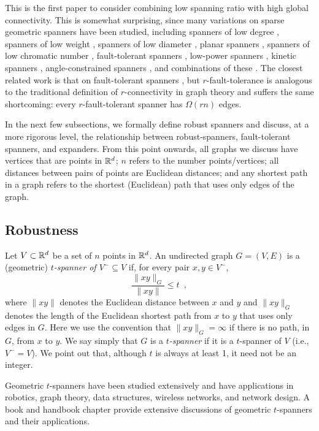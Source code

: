 \documentclass[final]{siamltex}
\begin{document}
This is the first paper to consider combining low spanning ratio
with high global connectivity.  This is somewhat surprising, since
many variations on sparse geometric spanners have been studied,
including spanners of low degree \cite{abcghsv08,cc10,s06}, spanners
of low weight \cite{bcfms10,dn97,gln02}, spanners of low diameter
\cite{ams94,ams99}, planar spanners \cite{accdsz96,c89,dj89,kg89},
spanners of low chromatic number \cite{bccmsz09}, fault-tolerant
spanners \cite{abfg09,cz04,lns02,l99}, low-power spanners
\cite{aack11,ss10,wl06}, kinetic spanners \cite{ab11,abg10},
angle-constrained spanners \cite{cs10}, and combinations of these
\cite{admss95,as97,bfrv12,bgs05,bsx09,cc10b}.  The closest related
work is that on fault-tolerant spanners \cite{abfg09,cz04,lns02,l99},
but $r$-fault-tolerance is analogous to the traditional definition
of $r$-connectivity in graph theory and suffers the same shortcoming:
every $r$-fault-tolerant spanner has $\Omega(rn)$ edges.

In the next few subsections, we formally define robust spanners
and discuss, at a more rigorous level, the relationship between
robust-spanners, fault-tolerant spanners, and expanders.  From this point
onwards, all graphs we discuss have vertices that are points in $\mathbb{R}^d$;
$n$ refers to the number points/vertices;  all distances between pairs of
points are Euclidean distances; and any shortest path in a graph refers
to the shortest (Euclidean) path that uses only edges of the graph.

\subsection{Robustness}

Let $V\subset \mathbb{R}^d$ be a set of $n$ points in $\mathbb{R}^d$.  An undirected
graph $G=(V,E)$ is a (geometric) \emph{$t$-spanner of $V^-\subseteq V$}
if, for every pair $x,y\in V^-$,
\[
  \frac{\|xy\|_G}{\|xy\|} \le t \enspace ,
\]
where $\|xy\|$ denotes the Euclidean distance between $x$ and $y$ and
$\|xy\|_G$ denotes the length of the Euclidean shortest path from $x$
to $y$ that uses only edges in $G$.  Here we use the convention that
$\|xy\|_G=\infty$ if there is no path, in $G$, from $x$ to $y$.  We say
simply that $G$ is a \emph{$t$-spanner} if it is a $t$-spanner of $V$
(i.e., $V^-=V$).  We point out that, although $t$ is always at least 1,
it need not be an integer.

Geometric $t$-spanners have been studied extensively and have applications
in robotics, graph theory, data structures, wireless networks, and network
design.  A book \cite{ns07} and handbook chapter \cite{e99} provide
extensive discussions of geometric $t$-spanners and their applications.
\end{document}

